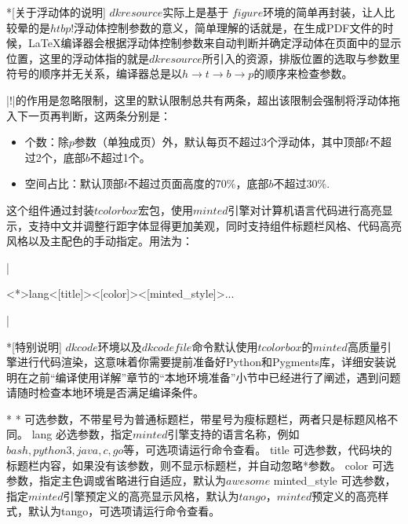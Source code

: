 \begin{dkcomment}*[关于浮动体的说明]
  \hspace{2em}$dkresource$实际上是基于{\LaTeXe} $figure$环境的简单再封装，让人比较晕的是$htbp!$浮动体控制参数的意义，简单理解的话就是，在生成PDF文件的时候，{\LaTeX}编译器会根据浮动体控制参数来自动判断并确定浮动体在页面中的显示位置，这里的浮动体指的就是$dkresource$所引入的资源，排版位置的选取与参数里符号的顺序并无关系，编译器总是以$h \to t \to b \to p$的顺序来检查参数。

  \hspace{2em}|!|的作用是忽略限制，这里的默认限制总共有两条，超出该限制会强制将浮动体拖入下一页再判断，这两条分别是：

  \begin{itemize}
    \item 个数：除$p$参数（单独成页）外，默认每页不超过3个浮动体，其中顶部$t$不超过2个，底部$b$不超过1个。
    \item 空间占比：默认顶部$t$不超过页面高度的70\%，底部$b$不超过30\%.
  \end{itemize}
\end{dkcomment}

这个组件通过封装$tcolorbox$宏包，使用$minted$引擎对计算机语言代码进行高亮显示，支持中文并调整行距字体显得更加美观，同时支持组件标题栏风格、代码高亮风格以及主配色的手动指定。用法为：

|\begin{dkcode}<*>{lang}<[title]><[color]><[minted_style]>...\end{dkcode}|

\begin{dkcomment}*[特别说明]
  $dkcode$环境以及$dkcodefile$命令默认使用$tcolorbox$的$minted$高质量引擎进行代码渲染，这意味着你需要提前准备好Python和Pygments库，详细安装说明在之前“编译使用详解”章节的“本地环境准备”小节中已经进行了阐述，遇到问题请随时检查本地环境是否满足编译条件。
\end{dkcomment}

\begin{cvskills}*
  \cvskill
  {*}
  {可选参数，不带星号为普通标题栏，带星号为瘦标题栏，两者只是标题风格不同。}
  \cvskill
  {lang}
  {必选参数，指定$minted$引擎支持的语言名称，例如$bash, python3, java, c, go$等，可选项请运行命令查看。}
  \cvskill
  {title}
  {可选参数，代码块的标题栏内容，如果没有该参数，则不显示标题栏，并自动忽略*参数。}
  \cvskill
  {color}
  {可选参数，指定主色调或省略进行自适应，默认为$awesome$}
  \cvskill
  {minted\_style}
  {可选参数，指定$minted$引擎预定义的高亮显示风格，默认为$tango$，$minted$预定义的高亮样式，默认为tango，可选项请运行命令查看。}
\end{cvskills}

